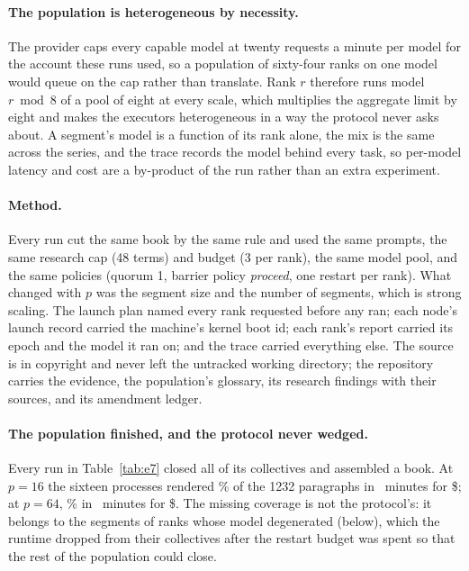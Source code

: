 \paragraph{The population is heterogeneous by necessity.} The provider caps
every capable model at twenty requests a minute per model for the account these
runs used, so a population of sixty-four ranks on one model would queue on the
cap rather than translate. Rank $r$ therefore runs model $r \bmod 8$ of a pool
of eight at every scale, which multiplies the aggregate limit by eight and makes
the executors heterogeneous in a way the protocol never asks about. A segment's
model is a function of its rank alone, the mix is the same across the series,
and the trace records the model behind every task, so per-model latency and cost
are a by-product of the run rather than an extra experiment.

\paragraph{Method.} Every run cut the same book by the same rule and used the
same prompts, the same research cap (48 terms) and budget (3 per rank), the same
model pool, and the same policies (quorum 1, barrier policy \emph{proceed}, one
restart per rank). What changed with $p$ was the segment size and the number of
segments, which is strong scaling. The launch plan named every rank requested
before any ran; each node's launch record carried the machine's kernel boot id;
each rank's report carried its epoch and the model it ran on; and the trace
carried everything else. The source is in copyright and never left the untracked
working directory; the repository carries the evidence, the population's
glossary, its research findings with their sources, and its amendment ledger.

\paragraph{The population finished, and the protocol never wedged.} Every run in
Table~\ref{tab:e7} closed all of its collectives and assembled a book. At $p=16$
the sixteen processes rendered \eSevenCoverageSixteen\% of the 1232 paragraphs
in \eSevenWallSixteen\ minutes for \$\eSevenCostSixteen; at $p=64$,
\eSevenCoverageSixtyfour\% in \eSevenWallSixtyfour\ minutes for
\$\eSevenCostSixtyfour. The missing coverage is not the protocol's: it belongs
to the segments of ranks whose model degenerated (below), which the runtime
dropped from their collectives after the restart budget was spent so that the
rest of the population could close.

